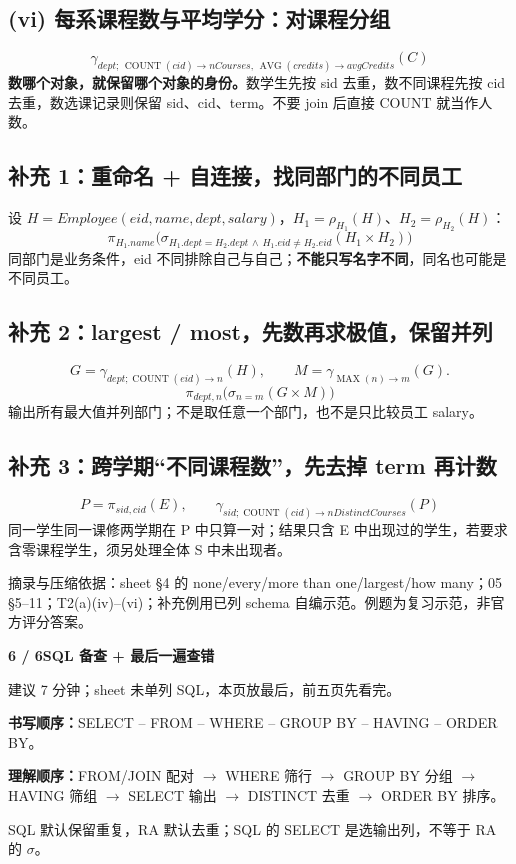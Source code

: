 \documentclass[11pt,a4paper]{article}
\newcommand{\stitle}[2]{{\sffamily\LARGE\bfseries\color{CUHKPurple}#1}\par{\small\color{Muted}#2}\par\vspace{3mm}}
\newcommand{\src}[1]{\par\vfill{\footnotesize\color{Muted}摘录与压缩依据：#1。例题为复习示范，非官方评分答案。}}
\begin{document}
\subsection{(vi) 每系课程数与平均学分：对课程分组}
\[
\boxed{\gamma_{dept;\,\operatorname{COUNT}(cid)\to nCourses,\,\operatorname{AVG}(credits)\to avgCredits}(C)}
\]
\textbf{数哪个对象，就保留哪个对象的身份。}数学生先按 sid 去重，数不同课程先按 cid 去重，数选课记录则保留 sid、cid、term。不要 join 后直接 COUNT 就当作人数。

\subsection{补充 1：重命名 + 自连接，找同部门的不同员工}
设 $H=Employee(eid,name,dept,salary)$，$H_1=\rho_{H_1}(H)$、$H_2=\rho_{H_2}(H)$：
\[
\boxed{\pi_{H_1.name}\bigl(\sigma_{H_1.dept=H_2.dept\,\land\,H_1.eid\ne H_2.eid}(H_1\times H_2)\bigr)}
\]
同部门是业务条件，eid 不同排除自己与自己；\textbf{不能只写名字不同}，同名也可能是不同员工。

\subsection{补充 2：largest / most，先数再求极值，保留并列}
\[
G=\gamma_{dept;\operatorname{COUNT}(eid)\to n}(H),\qquad M=\gamma_{\operatorname{MAX}(n)\to m}(G).
\]
\[
\boxed{\pi_{dept,n}\bigl(\sigma_{n=m}(G\times M)\bigr)}
\]
输出所有最大值并列部门；不是取任意一个部门，也不是只比较员工 salary。

\subsection{补充 3：跨学期“不同课程数”，先去掉 term 再计数}
\[
P=\pi_{sid,cid}(E),\qquad
\boxed{\gamma_{sid;\operatorname{COUNT}(cid)\to nDistinctCourses}(P)}
\]
同一学生同一课修两学期在 P 中只算一对；结果只含 E 中出现过的学生，若要求含零课程学生，须另处理全体 S 中未出现者。
\src{sheet §4 的 none/every/more than one/largest/how many；05 §5--11；T2(a)(iv)--(vi)；补充例用已列 schema 自编示范}

\clearpage
\stitle{6 / 6\quad SQL 备查 + 最后一遍查错}{建议 7 分钟；sheet 未单列 SQL，本页放最后，前五页先看完。}
\textbf{书写顺序：}\;SELECT -- FROM -- WHERE -- GROUP BY -- HAVING -- ORDER BY。\par
\textbf{理解顺序：}\;FROM/JOIN 配对 $\to$ WHERE 筛行 $\to$ GROUP BY 分组 $\to$ HAVING 筛组 $\to$ SELECT 输出 $\to$ DISTINCT 去重 $\to$ ORDER BY 排序。\par
SQL 默认保留重复，RA 默认去重；SQL 的 SELECT 是选输出列，不等于 RA 的 $\sigma$。
\end{document}

